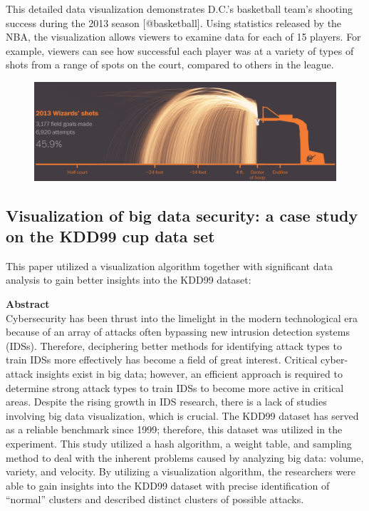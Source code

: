 \documentclass[]{book}
\theoremstyle{definition}
\theoremstyle{definition}
\theoremstyle{definition}
\theoremstyle{remark}
\begin{document}
This detailed data visualization demonstrates D.C.'s basketball team's
shooting success during the 2013 season {[}@basketball{]}. Using
statistics released by the NBA, the visualization allows viewers to
examine data for each of 15 players. For example, viewers can see how
successful each player was at a variety of types of shots from a range
of spots on the court, compared to others in the league.

\begin{figure}
\centering
\includegraphics{images/wizards_shooting.png}
\caption{}
\end{figure}

\subsection{Visualization of big data security: a case study on the
KDD99 cup data
set}\label{visualization-of-big-data-security-a-case-study-on-the-kdd99-cup-data-set}

This paper utilized a visualization algorithm together with significant
data analysis to gain better insights into the KDD99 dataset:

\textbf{Abstract}\\
Cybersecurity has been thrust into the limelight in the modern
technological era because of an array of attacks often bypassing new
intrusion detection systems (IDSs). Therefore, deciphering better
methods for identifying attack types to train IDSs more effectively has
become a field of great interest. Critical cyber-attack insights exist
in big data; however, an efficient approach is required to determine
strong attack types to train IDSs to become more active in critical
areas. Despite the rising growth in IDS research, there is a lack of
studies involving big data visualization, which is crucial. The KDD99
dataset has served as a reliable benchmark since 1999; therefore, this
dataset was utilized in the experiment. This study utilized a hash
algorithm, a weight table, and sampling method to deal with the inherent
problems caused by analyzing big data: volume, variety, and velocity. By
utilizing a visualization algorithm, the researchers were able to gain
insights into the KDD99 dataset with precise identification of
``normal'' clusters and described distinct clusters of possible attacks.
\end{document}
